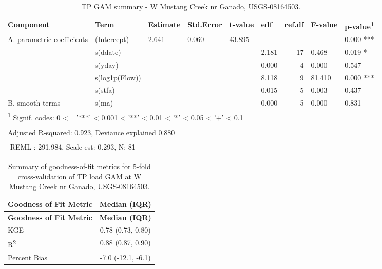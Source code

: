\documentclass[
]{article}
\newenvironment{widestuff}{\begin{table}[h]\begin{adjustwidth}{-4.5cm}{-4.5cm}\centering}{\end{adjustwidth}\end{table}}
\begin{document}
\begin{widestuff}

\caption{TP GAM summary - W Mustang Creek nr Ganado, USGS-08164503.}
\centering
\begin{tabular}[t]{llllllrll}
\toprule
Component & Term & Estimate & Std.Error & t-value & edf & ref.df & F-value & p-value\textsuperscript{1}\\
\midrule
A. parametric coefficients & (Intercept) & 2.641 & 0.060 & 43.895 &  &  &  & 0.000 ***\\
\cmidrule{1-9}
 & s(ddate) &  &  &  & 2.181 & 17 & 0.468 & 0.019 *\\

 & s(yday) &  &  &  & 0.000 & 4 & 0.000 & 0.547\\

 & s(log1p(Flow)) &  &  &  & 8.118 & 9 & 81.410 & 0.000 ***\\

 & s(stfa) &  &  &  & 0.015 & 5 & 0.003 & 0.437\\

\multirow[t]{-5}{*}{\raggedright\arraybackslash B. smooth terms} & s(ma) &  &  &  & 0.000 & 5 & 0.000 & 0.831\\
\bottomrule
\multicolumn{9}{l}{\textsuperscript{1} Signif. codes: 0 <= '***' < 0.001 < '**' < 0.01 < '*' < 0.05 < '+' < 0.1}\\
\multicolumn{9}{l}{\textsuperscript{} Adjusted R-squared: 0.923, Deviance explained 0.880}\\
\multicolumn{9}{l}{\textsuperscript{} -REML : 291.984, Scale est: 0.293, N: 81}\\
\end{tabular}
\end{widestuff}

\hypertarget{tbl-TP08164503-CV}{}
\begin{longtable}[]{@{}lc@{}}
\caption{\label{tbl-TP08164503-CV}Summary of goodness-of-fit metrics for
5-fold cross-validation of TP load GAM at W Mustang Creek nr Ganado,
USGS-08164503.}\tabularnewline
\toprule()
\textbf{Goodness of Fit Metric} & \textbf{Median (IQR)} \\
\midrule()
\endfirsthead
\toprule()
\textbf{Goodness of Fit Metric} & \textbf{Median (IQR)} \\
\midrule()
\endhead
KGE & 0.78 (0.73, 0.80) \\
R\textsuperscript{2} & 0.88 (0.87, 0.90) \\
Percent Bias & -7.0 (-12.1, -6.1) \\
\bottomrule()
\end{longtable}
\end{document}
